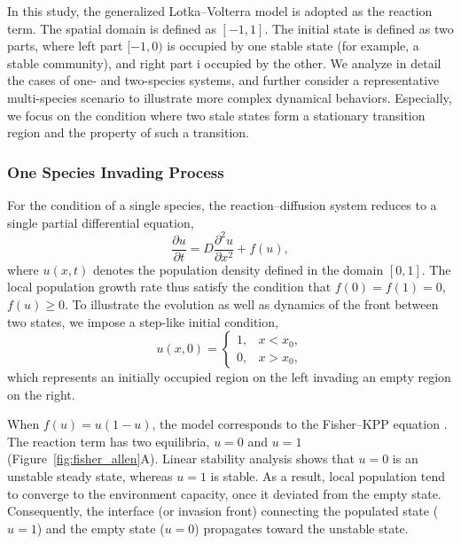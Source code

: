     In this study, the generalized Lotka--Volterra model is adopted as the reaction term. The spatial domain is defined as $[-1,1]$. The initial state is defined as two parts, where left part $[-1,0)$ is occupied by one stable state (for example, a stable community), and right part i occupied by the other. We analyze in detail the cases of one- and two-species systems, and further consider a representative multi-species scenario to illustrate more complex dynamical behaviors. Especially, we focus on the condition where two stale states form a stationary transition region and the property of such a transition.

    \subsubsection{One Species Invading Process}

        For the condition of a single species, the reaction--diffusion system reduces to a single partial differential equation,
        \begin{equation}\label{eqn:single_species}
            \frac{\partial u}{\partial t} = D \frac{\partial^2 u}{\partial x^2} + f(u),
        \end{equation}
        where $u(x,t)$ denotes the population density defined in the domain $[0,1]$. The local population growth rate thus satisfy the condition that $f(0) = f(1) = 0$, $f(u)\geq 0$. To illustrate the evolution as well as dynamics of the front between two states, we impose a step-like initial condition,
        \begin{equation*}
            u(x,0) =
            \begin{cases}
                1, & x < x_0, \\
                0, & x > x_0,
            \end{cases}
        \end{equation*}
        which represents an initially occupied region on the left invading an empty region on the right.

        When $f(u) = u(1-u)$, the model corresponds to the Fisher--KPP equation \citep{fisher_wave_1937,simpson_fisherkpp-type_2024}. The reaction term has two equilibria, $u=0$ and $u=1$ (Figure~\ref{fig:fisher_allen}A). Linear stability analysis shows that $u=0$ is an unstable steady state, whereas $u=1$ is stable. As a result, local population tend to converge to the environment capacity, once it deviated from the empty state. Consequently, the interface (or invasion front) connecting the populated state ($u=1$) and the empty state ($u=0$) propagates toward the unstable state.

